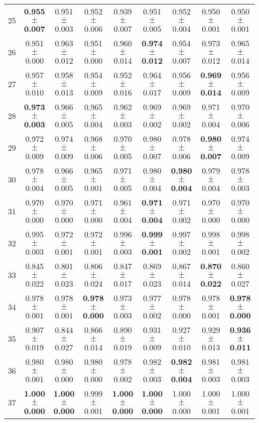 \begin{table}[!ht]
{\begin{tabular}{r c c c c c c c c}
25 & \textbf{0.955 $\pm$ 0.007} & 0.951 $\pm$ 0.003 & 0.952 $\pm$ 0.006 & 0.939 $\pm$ 0.007 & 0.951 $\pm$ 0.005 & 0.952 $\pm$ 0.004 & 0.950 $\pm$ 0.001 & 0.950 $\pm$ 0.001 \\
26 & 0.951 $\pm$ 0.000 & 0.963 $\pm$ 0.012 & 0.951 $\pm$ 0.000 & 0.960 $\pm$ 0.014 & \textbf{0.974 $\pm$ 0.012} & 0.954 $\pm$ 0.007 & 0.973 $\pm$ 0.012 & 0.965 $\pm$ 0.014 \\
27 & 0.957 $\pm$ 0.010 & 0.958 $\pm$ 0.013 & 0.954 $\pm$ 0.009 & 0.952 $\pm$ 0.016 & 0.964 $\pm$ 0.017 & 0.956 $\pm$ 0.009 & \textbf{0.969 $\pm$ 0.014} & 0.956 $\pm$ 0.009 \\
28 & \textbf{0.973 $\pm$ 0.003} & 0.966 $\pm$ 0.005 & 0.965 $\pm$ 0.004 & 0.962 $\pm$ 0.003 & 0.969 $\pm$ 0.002 & 0.969 $\pm$ 0.002 & 0.971 $\pm$ 0.004 & 0.970 $\pm$ 0.006 \\
29 & 0.972 $\pm$ 0.009 & 0.974 $\pm$ 0.009 & 0.968 $\pm$ 0.006 & 0.970 $\pm$ 0.005 & 0.980 $\pm$ 0.007 & 0.978 $\pm$ 0.006 & \textbf{0.980 $\pm$ 0.007} & 0.974 $\pm$ 0.009 \\
30 & 0.978 $\pm$ 0.004 & 0.966 $\pm$ 0.005 & 0.965 $\pm$ 0.001 & 0.971 $\pm$ 0.005 & 0.980 $\pm$ 0.004 & \textbf{0.980 $\pm$ 0.004} & 0.979 $\pm$ 0.004 & 0.978 $\pm$ 0.003 \\
31 & 0.970 $\pm$ 0.000 & 0.970 $\pm$ 0.000 & 0.971 $\pm$ 0.000 & 0.961 $\pm$ 0.004 & \textbf{0.971 $\pm$ 0.004} & 0.971 $\pm$ 0.002 & 0.970 $\pm$ 0.000 & 0.970 $\pm$ 0.000 \\
32 & 0.995 $\pm$ 0.003 & 0.972 $\pm$ 0.001 & 0.972 $\pm$ 0.001 & 0.996 $\pm$ 0.003 & \textbf{0.999 $\pm$ 0.001} & 0.997 $\pm$ 0.002 & 0.998 $\pm$ 0.001 & 0.998 $\pm$ 0.002 \\
33 & 0.845 $\pm$ 0.022 & 0.801 $\pm$ 0.023 & 0.806 $\pm$ 0.024 & 0.847 $\pm$ 0.017 & 0.869 $\pm$ 0.023 & 0.867 $\pm$ 0.014 & \textbf{0.870 $\pm$ 0.022} & 0.860 $\pm$ 0.027 \\
34 & 0.978 $\pm$ 0.001 & 0.978 $\pm$ 0.001 & \textbf{0.978 $\pm$ 0.000} & 0.973 $\pm$ 0.003 & 0.977 $\pm$ 0.002 & 0.978 $\pm$ 0.000 & 0.978 $\pm$ 0.001 & \textbf{0.978 $\pm$ 0.000} \\
35 & 0.907 $\pm$ 0.019 & 0.844 $\pm$ 0.027 & 0.866 $\pm$ 0.014 & 0.890 $\pm$ 0.019 & 0.931 $\pm$ 0.009 & 0.927 $\pm$ 0.010 & 0.929 $\pm$ 0.013 & \textbf{0.936 $\pm$ 0.011} \\
36 & 0.980 $\pm$ 0.001 & 0.980 $\pm$ 0.000 & 0.980 $\pm$ 0.000 & 0.978 $\pm$ 0.002 & 0.982 $\pm$ 0.003 & \textbf{0.982 $\pm$ 0.004} & 0.981 $\pm$ 0.003 & 0.981 $\pm$ 0.003 \\
37 & \textbf{1.000 $\pm$ 0.000} & \textbf{1.000 $\pm$ 0.000} & 0.999 $\pm$ 0.001 & \textbf{1.000 $\pm$ 0.000} & \textbf{1.000 $\pm$ 0.000} & 1.000 $\pm$ 0.000 & 1.000 $\pm$ 0.001 & 1.000 $\pm$ 0.001 \\

\end{tabular}}
\end{table}
